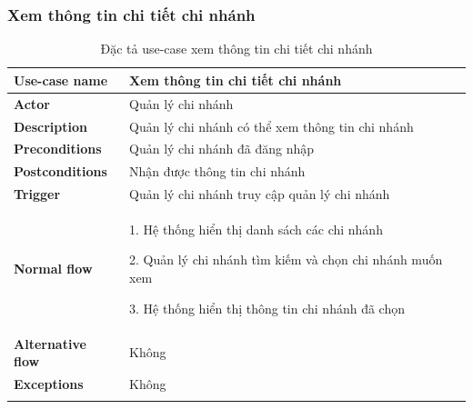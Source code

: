 \subsubsection{Xem thông tin chi tiết chi nhánh}
{
    \setlength\extrarowheight{6pt}
    \begin{longtable}{| p{} | p{} |}
        \hline
        \textbf{Use-case name}
         &
        Xem thông tin chi tiết chi nhánh
        \\
        \hline
        \textbf{Actor}
         &
        Quản lý chi nhánh
        \\
        \hline
        \textbf{Description}
         &
        Quản lý chi nhánh có thể xem thông tin chi nhánh
        \\
        \hline
        \textbf{Preconditions}
         &
        Quản lý chi nhánh đã đăng nhập
        \\
        \hline
        \textbf{Postconditions}
         &
        Nhận được thông tin chi nhánh
        \\
        \hline
        \textbf{Trigger}
         &
        Quản lý chi nhánh truy cập quản lý chi nhánh
        \\
        \hline
        \begin{flushleft}
            \textbf{Normal flow}
        \end{flushleft}
         &
        1. Hệ thống hiển thị danh sách các chi nhánh

        2. Quản lý chi nhánh tìm kiếm và chọn chi nhánh muốn xem

        3. Hệ thống hiển thị thông tin chi nhánh đã chọn
        \\
        \hline
        \textbf{Alternative flow}
         &
        Không
        \\
        \hline
        \textbf{Exceptions}
         &
        Không
        \\
        \hline
        \caption{Đặc tả use-case xem thông tin chi tiết chi nhánh}
    \end{longtable}
}

